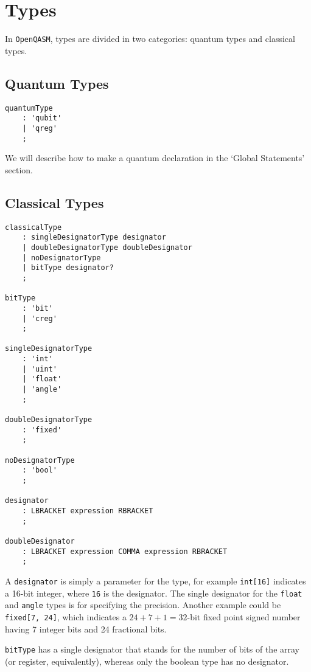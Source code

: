 \documentclass[12pt,a4paper]{report}
\theoremstyle{definition}
\theoremstyle{definition}
\theoremstyle{definition}
\begin{document}
\section{Types}
In \texttt{OpenQASM}, types are divided in two categories: quantum types and classical types.
\subsection{Quantum Types}
\begin{lstlisting}
quantumType
    : 'qubit'
    | 'qreg'
    ;
\end{lstlisting}
We will describe how to make a quantum declaration in the `Global Statements' section.

\subsection{Classical Types}
\begin{lstlisting}
classicalType
    : singleDesignatorType designator
    | doubleDesignatorType doubleDesignator
    | noDesignatorType
    | bitType designator?
    ;

bitType
    : 'bit'
    | 'creg'
    ;

singleDesignatorType
    : 'int'
    | 'uint'
    | 'float'
    | 'angle'
    ;

doubleDesignatorType
    : 'fixed'
    ;

noDesignatorType
    : 'bool'
    ;

designator
    : LBRACKET expression RBRACKET
    ;

doubleDesignator
    : LBRACKET expression COMMA expression RBRACKET
    ;
\end{lstlisting}
A \texttt{designator} is simply a parameter for the type, for example \texttt{int[16]} indicates a 16-bit integer, where \texttt{16} is the designator. The single designator for the \texttt{float} and \texttt{angle} types is for specifying the precision. Another example could be \texttt{fixed[7, 24]}, which indicates a $24+7+1=32$-bit fixed point signed number having 7 integer bits and 24 fractional bits.

\texttt{bitType} has a single designator that stands for the number of bits of the  array (or register, equivalently), whereas only the boolean type has no designator.
\end{document}

